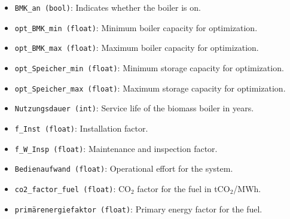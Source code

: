 \begin{itemize}
    \item \texttt{BMK\_an (bool)}: Indicates whether the boiler is on.
    \item \texttt{opt\_BMK\_min (float)}: Minimum boiler capacity for optimization.
    \item \texttt{opt\_BMK\_max (float)}: Maximum boiler capacity for optimization.
    \item \texttt{opt\_Speicher\_min (float)}: Minimum storage capacity for optimization.
    \item \texttt{opt\_Speicher\_max (float)}: Maximum storage capacity for optimization.
    \item \texttt{Nutzungsdauer (int)}: Service life of the biomass boiler in years.
    \item \texttt{f\_Inst (float)}: Installation factor.
    \item \texttt{f\_W\_Insp (float)}: Maintenance and inspection factor.
    \item \texttt{Bedienaufwand (float)}: Operational effort for the system.
    \item \texttt{co2\_factor\_fuel (float)}: CO$_2$ factor for the fuel in tCO$_2$/MWh.
    \item \texttt{primärenergiefaktor (float)}: Primary energy factor for the fuel.
\end{itemize}

